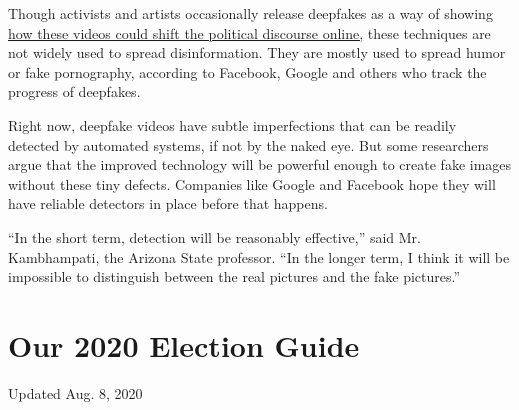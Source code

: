 Though activists and artists occasionally release deepfakes as a way of
showing
\href{https://www.nytimes.com/2019/06/11/technology/fake-zuckerberg-video-facebook.html}{how
these videos could shift the political discourse online,} these
techniques are not widely used to spread disinformation. They are mostly
used to spread humor or fake pornography, according to Facebook, Google
and others who track the progress of deepfakes.

Right now, deepfake videos have subtle imperfections that can be readily
detected by automated systems, if not by the naked eye. But some
researchers argue that the improved technology will be powerful enough
to create fake images without these tiny defects. Companies like Google
and Facebook hope they will have reliable detectors in place before that
happens.

``In the short term, detection will be reasonably effective,'' said Mr.
Kambhampati, the Arizona State professor. ``In the longer term, I think
it will be impossible to distinguish between the real pictures and the
fake pictures.''

\hypertarget{our-2020-election-guide}{%
\section{Our 2020 Election Guide}\label{our-2020-election-guide}}

Updated Aug. 8, 2020

